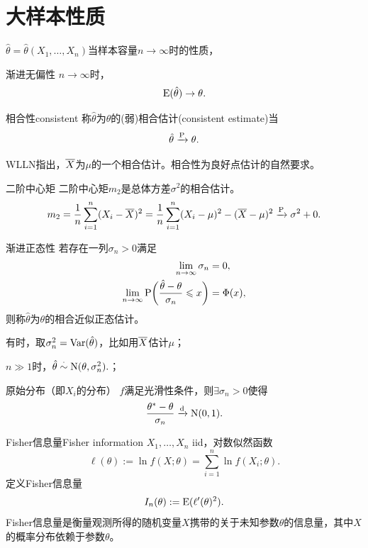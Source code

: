 \section{大样本性质}

$\hat\theta = \hat\theta(X_1,\ldots,X_n)$当样本容量$n \to \infty$时的性质，

\begin{definition}{渐进无偏性}{}
	$n \to \infty$时，
	\begin{equation}
		\E(\hat\theta) \to \theta.
	\end{equation}
\end{definition}
\begin{definition}{相合性}{consistent}
	称$\hat\theta$为$\theta$的(弱)相合估计(consistent estimate)当
	\begin{equation}
		\hat\theta \pto \theta.
	\end{equation}
\end{definition}
WLLN指出，$\avg X$为$\mu$的一个相合估计。相合性为良好点估计的自然要求。
\begin{example}{二阶中心矩}{}
	二阶中心矩$m_2$是总体方差$\sigma^2$的相合估计。
	\[
		m_2 = \frac1n\sum_{i=1}^n(X_i - \avg X)^2 = \frac1n\sum_{i=1}^n(X_i - \mu)^2 - (\avg X - \mu)^2 \pto \sigma^2 + 0.
	\]
\end{example}
\begin{definition}{渐进正态性}{}
	若存在一列$\sigma_n > 0$满足
	\begin{equation}\label{eq:ps-asymptotic-normality}
	    \begin{aligned}
			\lim_{n\to\infty}\sigma_n &= 0,\\
			\lim_{n\to\infty}\P\biggl(\frac{\hat\theta - \theta}{\sigma_n} \leqslant x\biggr) &= \Phi(x),
	    \end{aligned}
	\end{equation}
	则称$\hat\theta$为$\theta$的相合近似正态估计。
\end{definition}
\begin{compactenum}
	\item 有时，取$\sigma_n^2 = \Var(\hat\theta)$，比如用$\avg X$估计$\mu$；
	\item $n \gg 1$时，$\hat\theta \dotsim \NormalDist(\theta,\sigma_n^2).$；
	\item 原始分布（即$X_i$的分布） $f$满足光滑性条件，则$\exists\sigma_n > 0$使得
	\begin{equation}
		\label{MLE-dto-N01}
		\frac{\theta^\ast - \theta}{\sigma_n} \dto \NormalDist(0,1).
	\end{equation}
\end{compactenum}
\begin{definition}{Fisher信息量}{Fisher information}
	$X_1,\ldots,X_n$ iid，对数似然函数
	\begin{equation}\label{eq:ps-iid-log-likelihood}
		\ell(\theta) := \ln f(X;\theta) = \sum_{i=1}^n\ln f(X_i;\theta).
	\end{equation}
	定义Fisher信息量
	\begin{equation}
		I_n(\theta) := \E(\ell'(\theta)^2).
	\end{equation}
	Fisher信息量是衡量观测所得的随机变量$X$携带的关于未知参数$\theta$的信息量，其中$X$的概率分布依赖于参数$\theta$。
\end{definition}

